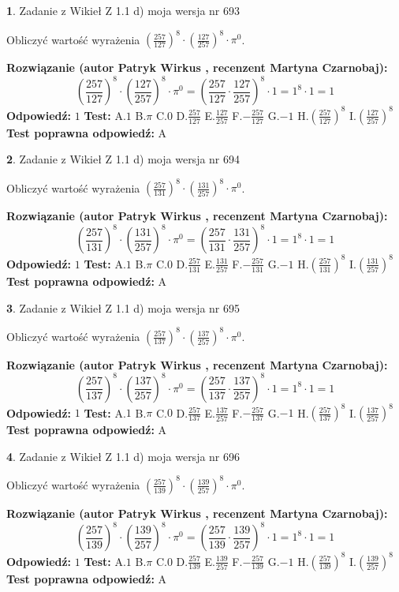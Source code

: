 \documentclass[12pt, a4paper]{article}
\theoremstyle{definition} %
\newtheorem{zad}{}
\newcommand{\zadStart}[1]{\begin{zad}#1\newline}
\newcommand{\zadStop}{\end{zad}}
\newcommand{\rozwStart}[2]{\noindent \textbf{Rozwiązanie (autor #1 , recenzent #2): }\newline}
\newcommand{\rozwStop}{\newline}
\newcommand{\odpStart}{\noindent \textbf{Odpowiedź:}\newline}
\newcommand{\odpStop}{\newline}
\newcommand{\testStart}{\noindent \textbf{Test:}\newline}
\newcommand{\testStop}{\newline}
\newcommand{\kluczStart}{\noindent \textbf{Test poprawna odpowiedź:}\newline}
\newcommand{\kluczStop}{\newline}
\begin{document}
\zadStart{Zadanie z Wikieł Z 1.1 d) moja wersja nr 693}

Obliczyć wartość wyrażenia $(\frac{257}{127})^{8} \cdot (\frac{127}{257})^{8} \cdot \pi^{0}$.
\zadStop
\rozwStart{Patryk Wirkus}{Martyna Czarnobaj}
$$(\frac{257}{127})^{8} \cdot (\frac{127}{257})^{8} \cdot \pi^{0} = (\frac{257}{127} \cdot \frac{127}{257})^{8} \cdot 1 = 1^{8} \cdot 1 = 1$$
\rozwStop
\odpStart
$1$
\odpStop
\testStart
A.$1$ B.$\pi$ C.$0$ D.$\frac{257}{127}$ E.$\frac{127}{257}$
F.$-\frac{257}{127}$ G.$-1$
H.$(\frac{257}{127})^{8}$
I.$(\frac{127}{257})^{8}$
\testStop
\kluczStart
A
\kluczStop



\zadStart{Zadanie z Wikieł Z 1.1 d) moja wersja nr 694}

Obliczyć wartość wyrażenia $(\frac{257}{131})^{8} \cdot (\frac{131}{257})^{8} \cdot \pi^{0}$.
\zadStop
\rozwStart{Patryk Wirkus}{Martyna Czarnobaj}
$$(\frac{257}{131})^{8} \cdot (\frac{131}{257})^{8} \cdot \pi^{0} = (\frac{257}{131} \cdot \frac{131}{257})^{8} \cdot 1 = 1^{8} \cdot 1 = 1$$
\rozwStop
\odpStart
$1$
\odpStop
\testStart
A.$1$ B.$\pi$ C.$0$ D.$\frac{257}{131}$ E.$\frac{131}{257}$
F.$-\frac{257}{131}$ G.$-1$
H.$(\frac{257}{131})^{8}$
I.$(\frac{131}{257})^{8}$
\testStop
\kluczStart
A
\kluczStop



\zadStart{Zadanie z Wikieł Z 1.1 d) moja wersja nr 695}

Obliczyć wartość wyrażenia $(\frac{257}{137})^{8} \cdot (\frac{137}{257})^{8} \cdot \pi^{0}$.
\zadStop
\rozwStart{Patryk Wirkus}{Martyna Czarnobaj}
$$(\frac{257}{137})^{8} \cdot (\frac{137}{257})^{8} \cdot \pi^{0} = (\frac{257}{137} \cdot \frac{137}{257})^{8} \cdot 1 = 1^{8} \cdot 1 = 1$$
\rozwStop
\odpStart
$1$
\odpStop
\testStart
A.$1$ B.$\pi$ C.$0$ D.$\frac{257}{137}$ E.$\frac{137}{257}$
F.$-\frac{257}{137}$ G.$-1$
H.$(\frac{257}{137})^{8}$
I.$(\frac{137}{257})^{8}$
\testStop
\kluczStart
A
\kluczStop



\zadStart{Zadanie z Wikieł Z 1.1 d) moja wersja nr 696}

Obliczyć wartość wyrażenia $(\frac{257}{139})^{8} \cdot (\frac{139}{257})^{8} \cdot \pi^{0}$.
\zadStop
\rozwStart{Patryk Wirkus}{Martyna Czarnobaj}
$$(\frac{257}{139})^{8} \cdot (\frac{139}{257})^{8} \cdot \pi^{0} = (\frac{257}{139} \cdot \frac{139}{257})^{8} \cdot 1 = 1^{8} \cdot 1 = 1$$
\rozwStop
\odpStart
$1$
\odpStop
\testStart
A.$1$ B.$\pi$ C.$0$ D.$\frac{257}{139}$ E.$\frac{139}{257}$
F.$-\frac{257}{139}$ G.$-1$
H.$(\frac{257}{139})^{8}$
I.$(\frac{139}{257})^{8}$
\testStop
\kluczStart
A
\kluczStop
\end{document}
